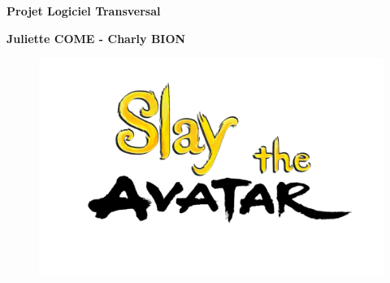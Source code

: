 \thispagestyle{empty}

\begin{titlepage}

\vspace*{2cm}

\begin{center}\textbf{\Huge Projet Logiciel Transversal}\end{center}{\Large \par}

\begin{center}\textbf{\large Juliette COME - Charly BION}\end{center}{\large \par}

\vspace{2cm}

\begin{figure}[h]
\begin{center}
\includegraphics[width=15cm]{images/slaytheavatar.png}%
\end{center}
\end{figure}

\clearpage

{\small
\tableofcontents
}

\end{titlepage}

\clearpage